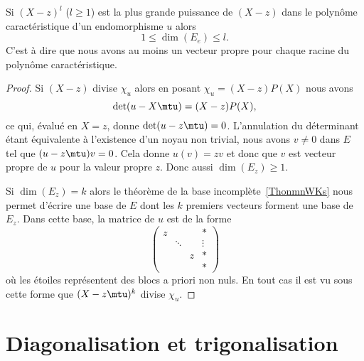 \begin{proposition}\label{PropooBYZCooBmYLSc}
    Si \( (X-z)^l\) (\( l\geq 1\)) est la plus grande puissance de \( (X-z)\) dans le polynôme caractéristique d'un endomorphisme \( u\) alors
    \begin{equation}
        1\leq \dim(E_e)\leq l.
    \end{equation}
    C'est à dire que nous avons au moins un vecteur propre pour chaque racine du polynôme caractéristique.
\end{proposition}

\begin{proof}
    Si $(X-z)$ divise \( \chi_u\) alors en posant \( \chi_u=(X-z)P(X)\) nous avons
    \begin{equation}
        \det(u-X\mtu)=(X-z)P(X),
    \end{equation}
    ce qui, évalué en \( X=z\), donne \( \det(u-z\mtu)=0\). L'annulation du déterminant étant équivalente à l'existence d'un noyau non trivial, nous avons \( v\neq 0\) dans \( E\) tel que \( (u-z\mtu)v=0\). Cela donne \( u(v)=zv\) et donc que \( v\) est vecteur propre de \( u\) pour la valeur propre \( z\). Donc aussi \( \dim(E_z)\geq 1\).

    Si \( \dim(E_z)=k\) alors le théorème de la base incomplète~\ref{ThonmnWKs} nous permet d'écrire une base de \( E\) dont les \( k\) premiers vecteurs forment une base de \( E_z\). Dans cette base, la matrice de \( u\) est de la forme
    \begin{equation}
        \begin{pmatrix}
             z   &       &       &   *    \\
                &   \ddots    &       &   \vdots    \\
                &       &   z    &   *    \\
                &       &       &   *
         \end{pmatrix}
    \end{equation}
    où les étoiles représentent des blocs a priori non nuls. En tout cas il est vu sous cette forme que \( (X-z\mtu)^k\) divise \( \chi_u\).
\end{proof}

\section{Diagonalisation et trigonalisation}

